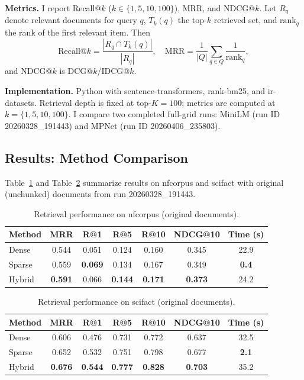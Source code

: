 \documentclass[twoside, 11pt]{article}
\begin{document}
\textbf{Metrics.} I report Recall@$k$ ($k \in \{1, 5, 10, 100\}$), MRR, and NDCG@$k$. Let $R_q$ denote relevant documents for query $q$, $T_k(q)$ the top-$k$ retrieved set, and $\text{rank}_q$ the rank of the first relevant item. Then
\[
\text{Recall@}k = \frac{|R_q \cap T_k(q)|}{|R_q|}, \quad
\text{MRR} = \frac{1}{|Q|}\sum_{q \in Q}\frac{1}{\text{rank}_q},
\]
and NDCG@$k$ is DCG@$k$/IDCG@$k$.

\textbf{Implementation.} Python with sentence-transformers, rank-bm25, and ir-datasets. Retrieval depth is fixed at top-$K=100$; metrics are computed at $k=\{1,5,10,100\}$. I compare two completed full-grid runs: MiniLM (run ID 20260328\_191443) and MPNet (run ID 20260406\_235803).

\subsection{Results: Method Comparison}
Table~\ref{tab:nfcorpus} and Table~\ref{tab:scifact} summarize results on nfcorpus and scifact with original (unchunked) documents from run 20260328\_191443.

\begin{table}[htbp]
\centering
\caption{Retrieval performance on nfcorpus (original documents).}
\label{tab:nfcorpus}
\begin{tabular}{lcccccc}
\toprule
Method & MRR & R@1 & R@5 & R@10 & NDCG@10 & Time (s) \\
\midrule
Dense  & 0.544 & 0.051 & 0.124 & 0.160 & 0.345 & 22.9 \\
Sparse & 0.559 & \textbf{0.069} & 0.134 & 0.167 & 0.349 & \textbf{0.4} \\
Hybrid & \textbf{0.591} & 0.066 & \textbf{0.144} & \textbf{0.171} & \textbf{0.373} & 24.2 \\
\bottomrule
\end{tabular}
\end{table}

\begin{table}[htbp]
\centering
\caption{Retrieval performance on scifact (original documents).}
\label{tab:scifact}
\begin{tabular}{lcccccc}
\toprule
Method & MRR & R@1 & R@5 & R@10 & NDCG@10 & Time (s) \\
\midrule
Dense  & 0.606 & 0.476 & 0.731 & 0.772 & 0.637 & 32.5 \\
Sparse & 0.652 & 0.532 & 0.751 & 0.798 & 0.677 & \textbf{2.1} \\
Hybrid & \textbf{0.676} & \textbf{0.544} & \textbf{0.777} & \textbf{0.828} & \textbf{0.703} & 35.2 \\
\bottomrule
\end{tabular}
\end{table}
\end{document}
